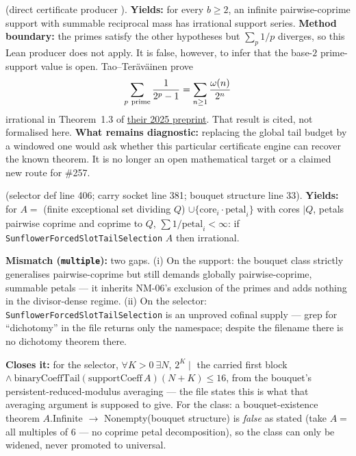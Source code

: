 \begin{obs} 
(direct certificate producer
).
\textbf{Yields:} for every $b\ge2$, an infinite pairwise-coprime support with
summable reciprocal mass has irrational support series.
\textbf{Method boundary:} the primes satisfy the other hypotheses but
$\sum_p1/p$ diverges, so this Lean producer does not apply.  It is false,
however, to infer that the base-$2$ prime-support value is open.
Tao--Ter\"av\"ainen prove
\[
 \sum_{p\ {\rm prime}}\frac1{2^p-1}
 =\sum_{n\ge1}\frac{\omega(n)}{2^n}
\]
irrational in Theorem~1.3 of
\href{https://arxiv.org/abs/2512.01739}{their 2025 preprint}.  That result is
cited, not formalised here.
\textbf{What remains diagnostic:} replacing the global tail budget by a
windowed one would ask whether this particular certificate engine can recover
the known theorem.  It is no longer an open mathematical target or a claimed
new route for \#257.
\end{obs}

\begin{obs} 
(selector def line 406; carry socket line 381; bouquet structure line 33).
\textbf{Yields:} for $A=$ (finite exceptional set dividing $Q$) $\cup \{\mathrm{core}_i \cdot
\mathrm{petal}_i\}$ with cores $\mid Q$, petals pairwise coprime and coprime to $Q$, $\sum
1/\mathrm{petal}_i<\infty$: if \texttt{SunflowerForcedSlotTailSelection} $A$ then irrational.

\par\medskip

\textbf{Mismatch (\texttt{multiple}):} two gaps. (i) On the support: the bouquet class strictly
generalises pairwise-coprime but still demands globally pairwise-coprime, summable petals — it
inherits NM-06's exclusion of the primes and adds nothing in the divisor-dense regime. (ii) On
the selector: \texttt{SunflowerForcedSlotTailSelection} is an unproved cofinal supply — grep for
``dichotomy'' in the file returns only the namespace; despite the filename there is no dichotomy
theorem there.

\par\medskip

\textbf{Closes it:} for the selector, $\forall K{>}0\ \exists N$, $2^K \mid$ the carried first
block $\wedge\ \mathrm{binaryCoeffTail}(\mathrm{supportCoeff}\,A)(N{+}K)\le16$, from the
bouquet's persistent-reduced-modulus averaging — the file states this is what that averaging
argument is supposed to give. For the class: a bouquet-existence theorem $A$.Infinite $\to$
Nonempty(bouquet structure) is \emph{false} as stated (take $A=$ all multiples of 6 — no coprime
petal decomposition), so the class can only be widened, never promoted to universal.
\end{obs}

